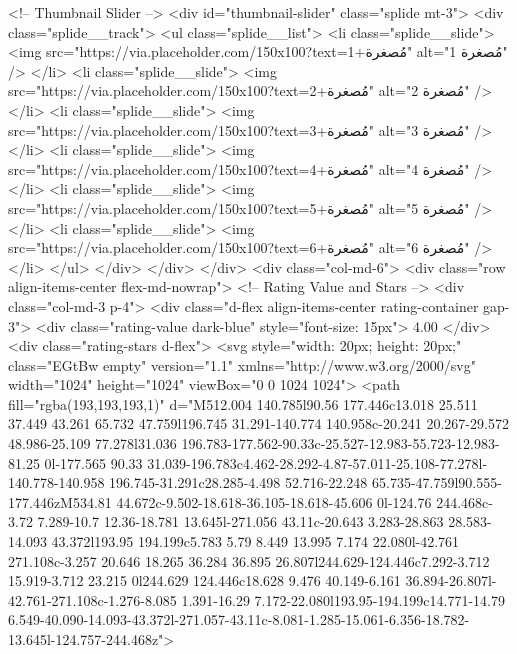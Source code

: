           <!-- Thumbnail Slider -->
          <div id="thumbnail-slider" class="splide mt-3">
            <div class="splide__track">
              <ul class="splide__list">
                <li class="splide__slide">
                  <img src="https://via.placeholder.com/150x100?text=مُصغرة+1" alt="مُصغرة 1" />
                </li>
                <li class="splide__slide">
                  <img src="https://via.placeholder.com/150x100?text=مُصغرة+2" alt="مُصغرة 2" />
                </li>
                <li class="splide__slide">
                  <img src="https://via.placeholder.com/150x100?text=مُصغرة+3" alt="مُصغرة 3" />
                </li>
                <li class="splide__slide">
                  <img src="https://via.placeholder.com/150x100?text=مُصغرة+4" alt="مُصغرة 4" />
                </li>
                <li class="splide__slide">
                  <img src="https://via.placeholder.com/150x100?text=مُصغرة+5" alt="مُصغرة 5" />
                </li>
                <li class="splide__slide">
                  <img src="https://via.placeholder.com/150x100?text=مُصغرة+6" alt="مُصغرة 6" />
                </li>
              </ul>
            </div>
          </div>
        </div>
        <div class="col-md-6">
          <div class="row align-items-center flex-md-nowrap">
            <!-- Rating Value and Stars -->
            <div class="col-md-3 p-4">
              <div class="d-flex align-items-center rating-container gap-3">
                <div class="rating-value dark-blue" style="font-size: 15px">
                  4.00
                </div>
                <div class="rating-stars d-flex">
                  <svg style="width: 20px; height: 20px;" class="EGtBw empty" version="1.1"
                    xmlns="http://www.w3.org/2000/svg" width="1024" height="1024" viewBox="0 0 1024 1024">
                    <path fill="rgba(193,193,193,1)"
                      d="M512.004 140.785l90.56 177.446c13.018 25.511 37.449 43.261 65.732 47.759l196.745 31.291-140.774 140.958c-20.241 20.267-29.572 48.986-25.109 77.278l31.036 196.783-177.562-90.33c-25.527-12.983-55.723-12.983-81.25 0l-177.565 90.33 31.039-196.783c4.462-28.292-4.87-57.011-25.108-77.278l-140.778-140.958 196.745-31.291c28.285-4.498 52.716-22.248 65.735-47.759l90.555-177.446zM534.81 44.672c-9.502-18.618-36.105-18.618-45.606 0l-124.76 244.468c-3.72 7.289-10.7 12.36-18.781 13.645l-271.056 43.11c-20.643 3.283-28.863 28.583-14.093 43.372l193.95 194.199c5.783 5.79 8.449 13.995 7.174 22.080l-42.761 271.108c-3.257 20.646 18.265 36.284 36.895 26.807l244.629-124.446c7.292-3.712 15.919-3.712 23.215 0l244.629 124.446c18.628 9.476 40.149-6.161 36.894-26.807l-42.761-271.108c-1.276-8.085 1.391-16.29 7.172-22.080l193.95-194.199c14.771-14.79 6.549-40.090-14.093-43.372l-271.057-43.11c-8.081-1.285-15.061-6.356-18.782-13.645l-124.757-244.468z">
